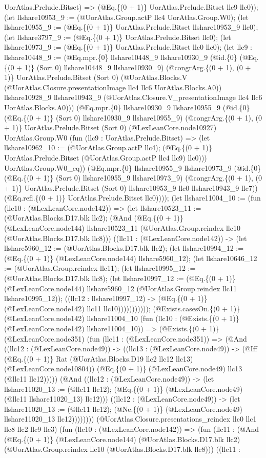 \documentclass[11pt]{article}
\begin{document}
UorAtlas.Prelude.Bitset) => (@Eq.\{(0 + 1)\} UorAtlas.Prelude.Bitset llc9 llc0)); (let llshare10953\_9 := (@UorAtlas.Group.actP llc4 UorAtlas.Group.W0); (let llshare10955\_9 := (@Eq.\{(0 + 1)\} UorAtlas.Prelude.Bitset llshare10953\_9 llc0); (let llshare3797\_9 := (@Eq.\{(0 + 1)\} UorAtlas.Prelude.Bitset llc0); (let llshare10973\_9 := (@Eq.\{(0 + 1)\} UorAtlas.Prelude.Bitset llc0 llc0); (let llc9 : llshare10448\_9 := (@Eq.mpr.\{0\} llshare10448\_9 llshare10930\_9 (@id.\{0\} (@Eq.\{(0 + 1)\} (Sort 0) llshare10448\_9 llshare10930\_9) (@congrArg.\{(0 + 1), (0 + 1)\} UorAtlas.Prelude.Bitset (Sort 0) (@UorAtlas.Blocks.V (@UorAtlas.Closure.presentationImage llc4 llc6 UorAtlas.Blocks.A0)) llshare10928\_9 llshare10943\_9 (@UorAtlas.Closure.V\_presentationImage llc4 llc6 UorAtlas.Blocks.A0))) (@Eq.mpr.\{0\} llshare10930\_9 llshare10955\_9 (@id.\{0\} (@Eq.\{(0 + 1)\} (Sort 0) llshare10930\_9 llshare10955\_9) (@congrArg.\{(0 + 1), (0 + 1)\} UorAtlas.Prelude.Bitset (Sort 0) (@LexLeanCore.node10927) UorAtlas.Group.W0 (fun (llc9 : UorAtlas.Prelude.Bitset) => (let llshare10962\_10 := (@UorAtlas.Group.actP llc4); (@Eq.\{(0 + 1)\} UorAtlas.Prelude.Bitset (@UorAtlas.Group.actP llc4 llc9) llc0))) UorAtlas.Group.W0\_eq)) (@Eq.mpr.\{0\} llshare10955\_9 llshare10973\_9 (@id.\{0\} (@Eq.\{(0 + 1)\} (Sort 0) llshare10955\_9 llshare10973\_9) (@congrArg.\{(0 + 1), (0 + 1)\} UorAtlas.Prelude.Bitset (Sort 0) llshare10953\_9 llc0 llshare10943\_9 llc7)) (@Eq.refl.\{(0 + 1)\} UorAtlas.Prelude.Bitset llc0)))); (let llshare11004\_10 := (fun (llc10 : (@LexLeanCore.node142)) => (let llshare10523\_11 := (@UorAtlas.Blocks.D17.blk llc2); (@And (@Eq.\{(0 + 1)\} (@LexLeanCore.node144) llshare10523\_11 (@UorAtlas.Group.reindex llc10 (@UorAtlas.Blocks.D17.blk llc8))) ((llc11 : (@LexLeanCore.node142)) -> (let llshare5960\_12 := (@UorAtlas.Blocks.D17.blk llc2); (let llshare10994\_12 := (@Eq.\{(0 + 1)\} (@LexLeanCore.node144) llshare5960\_12); (let llshare10646\_12 := (@UorAtlas.Group.reindex llc11); (let llshare10995\_12 := (@UorAtlas.Blocks.D17.blk llc8); (let llshare10997\_12 := (@Eq.\{(0 + 1)\} (@LexLeanCore.node144) llshare5960\_12 (@UorAtlas.Group.reindex llc11 llshare10995\_12)); ((llc12 : llshare10997\_12) -> (@Eq.\{(0 + 1)\} (@LexLeanCore.node142) llc11 llc10))))))))))); (@Exists.casesOn.\{(0 + 1)\} (@LexLeanCore.node142) llshare11004\_10 (fun (llc10 : (@Exists.\{(0 + 1)\} (@LexLeanCore.node142) llshare11004\_10)) => (@Exists.\{(0 + 1)\} (@LexLeanCore.node351) (fun (llc11 : (@LexLeanCore.node351)) => (@And ((llc12 : (@LexLeanCore.node49)) -> ((llc13 : (@LexLeanCore.node49)) -> (@Iff (@Eq.\{(0 + 1)\} Rat (@UorAtlas.Blocks.D19 llc2 llc12 llc13) (@LexLeanCore.node10804)) (@Eq.\{(0 + 1)\} (@LexLeanCore.node49) llc13 (@llc11 llc12))))) (@And ((llc12 : (@LexLeanCore.node49)) -> (let llshare11020\_13 := (@llc11 llc12); (@Eq.\{(0 + 1)\} (@LexLeanCore.node49) (@llc11 llshare11020\_13) llc12))) ((llc12 : (@LexLeanCore.node49)) -> (let llshare11020\_13 := (@llc11 llc12); (@Ne.\{(0 + 1)\} (@LexLeanCore.node49) llshare11020\_13 llc12)))))))) (@UorAtlas.Closure.presentations\_reindex llc0 llc1 llc8 llc2 llc9 llc3) (fun (llc10 : (@LexLeanCore.node142)) => (fun (llc11 : (@And (@Eq.\{(0 + 1)\} (@LexLeanCore.node144) (@UorAtlas.Blocks.D17.blk llc2) (@UorAtlas.Group.reindex llc10 (@UorAtlas.Blocks.D17.blk llc8))) ((llc11 : 
\end{document}
